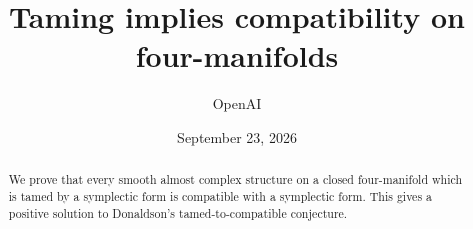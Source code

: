 \documentclass[11pt]{article}
\title{Taming implies compatibility on four-manifolds}
\author{OpenAI}
\date{September 23, 2026}
\begin{document}
\maketitle
\begin{abstract}
We prove that every smooth almost complex structure on a closed four-manifold
which is tamed by a symplectic form is compatible with a symplectic form.
This gives a positive solution to Donaldson's tamed-to-compatible conjecture.
\end{abstract}







\begingroup
\small


\endgroup
\end{document}

